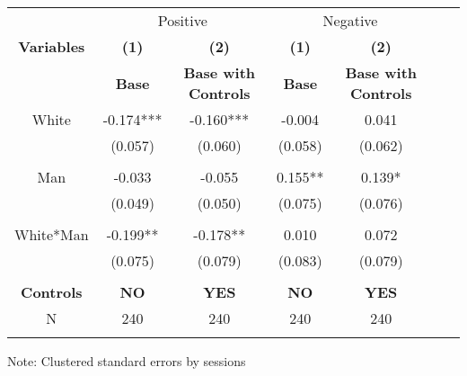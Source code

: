 \begin{table}[htbp]
    \begin{tabular}{c c c c c c c }
    \toprule
    &\multicolumn{2}{c}{Positive}         &\multicolumn{2}{c}{Negative}      \\

    \textbf{Variables} & \textbf{(1)} & \textbf{(2)}  & \textbf{(1)} & \textbf{(2)}              \\ 

    \textbf & \textbf{ Base } & \textbf{Base with Controls}  & \textbf{ Base } & \textbf{Base with Controls}  \\ 

    \midrule
    White              & -0.174***   & -0.160***   & -0.004     & 0.041  \\
                       & (0.057)     & (0.060)     & (0.058)    & (0.062)   \\
                       &             &             &            &                  \\
    Man                & -0.033       & -0.055     & 0.155**     & 0.139*  \\
                       & (0.049)     & (0.050)     & (0.075)    & (0.076)   \\
                       &             &             &            &                  \\
    White*Man          & -0.199**     & -0.178**      & 0.010      & 0.072  \\
                       & (0.075)     & (0.079)     & (0.083)    & (0.079)   \\
                       &             &             &            &                  \\
\midrule
    
\textbf{Controls} & \textbf{ NO } & \textbf{YES}  & \textbf{ NO } & \textbf{YES}  \\ 
   

    \midrule
     N                  &   240          &      240  &     240  &     240        \\          
    \bottomrule
    \addlinespace[1ex]
    \multicolumn{3}{l}{\textsuperscript{***}$p<0.01$, 
      \textsuperscript{**}$p<0.05$, 
      \textsuperscript{*}$p<0.1$}
    \end{tabular}
    \newline
    Note: Clustered standard errors by sessions
\end{table}
